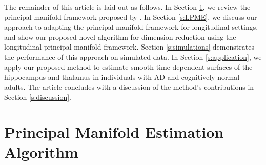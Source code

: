 \documentclass[12pt]{article}
\theoremstyle{definition}
\begin{document}
The remainder of this article is laid out as follows. In Section \ref{s:PME}, we review the principal manifold framework proposed by \cite{mengPrincipalManifoldEstimation2021}. In Section \ref{s:LPME}, we discuss our approach to adapting the principal manifold framework for longitudinal settings, and show our proposed novel  algorithm for dimension reduction using the longitudinal principal manifold framework. Section \ref{s:simulations} demonstrates the performance of this approach on simulated data. In Section \ref{s:application}, we apply our proposed method to estimate smooth time dependent surfaces of the hippocampus and thalamus in individuals with AD and cognitively normal adults. The article concludes with a discussion of the method's contributions in Section \ref{s:discussion}.








\section{Principal Manifold Estimation Algorithm}\label{s:PME}
\end{document}
